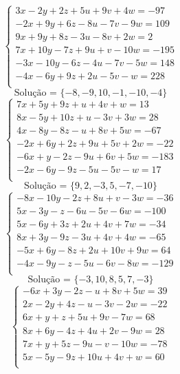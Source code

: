 \documentclass[12pt,oneside,a4paper]{article}
\begin{document}
\vspace{\baselineskip}
\begin{equation*}
\begin{cases}
3x-2y+2z+5u+9v+4w=-97 \\
-2x+9y+6z-8u-7v-9w=109 \\
9x+9y+8z-3u-8v+2w=2 \\
7x+10y-7z+9u+v-10w=-195 \\
-3x-10y-6z-4u-7v-5w=148 \\
-4x-6y+9z+2u-5v-w=228 \\
\end{cases}
\end{equation*}
\begin{equation*}
\text{Solução = }\{-8,-9,10,-1,-10,-4\}
\end{equation*}
\vspace{\baselineskip}
\begin{equation*}
\begin{cases}
7x+5y+9z+u+4v+w=13 \\
8x-5y+10z+u-3v+3w=28 \\
4x-8y-8z-u+8v+5w=-67 \\
-2x+6y+2z+9u+5v+2w=-22 \\
-6x+y-2z-9u+6v+5w=-183 \\
-2x-6y-9z-5u-5v-w=17 \\
\end{cases}
\end{equation*}
\begin{equation*}
\text{Solução = }\{9,2,-3,5,-7,-10\}
\end{equation*}
\vspace{\baselineskip}
\begin{equation*}
\begin{cases}
-8x-10y-2z+8u+v-3w=-36 \\
5x-3y-z-6u-5v-6w=-100 \\
5x-6y+3z+2u+4v+7w=-34 \\
8x+3y-9z-3u+4v+4w=-65 \\
-5x+6y-8z+2u+10v+9w=64 \\
-4x-9y-z-5u-6v-8w=-129 \\
\end{cases}
\end{equation*}
\begin{equation*}
\text{Solução = }\{-3,10,8,5,7,-3\}
\end{equation*}
\vspace{\baselineskip}
\begin{equation*}
\begin{cases}
-6x+3y-2z-u+8v+5w=39 \\
2x-2y+4z-u-3v-2w=-22 \\
6x+y+z+5u+9v-7w=68 \\
8x+6y-4z+4u+2v-9w=28 \\
7x+y+5z-9u-v-10w=-78 \\
5x-5y-9z+10u+4v+w=60 \\
\end{cases}
\end{equation*}
\end{document}
